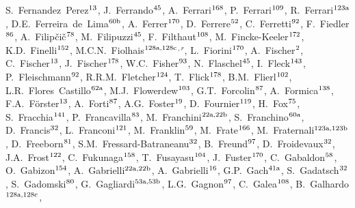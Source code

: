 \begin{flushleft}
S.~Fernandez~Perez$^\textrm{\scriptsize 13}$,
J.~Ferrando$^\textrm{\scriptsize 45}$,
A.~Ferrari$^\textrm{\scriptsize 168}$,
P.~Ferrari$^\textrm{\scriptsize 109}$,
R.~Ferrari$^\textrm{\scriptsize 123a}$,
D.E.~Ferreira~de~Lima$^\textrm{\scriptsize 60b}$,
A.~Ferrer$^\textrm{\scriptsize 170}$,
D.~Ferrere$^\textrm{\scriptsize 52}$,
C.~Ferretti$^\textrm{\scriptsize 92}$,
F.~Fiedler$^\textrm{\scriptsize 86}$,
A.~Filip\v{c}i\v{c}$^\textrm{\scriptsize 78}$,
M.~Filipuzzi$^\textrm{\scriptsize 45}$,
F.~Filthaut$^\textrm{\scriptsize 108}$,
M.~Fincke-Keeler$^\textrm{\scriptsize 172}$,
K.D.~Finelli$^\textrm{\scriptsize 152}$,
M.C.N.~Fiolhais$^\textrm{\scriptsize 128a,128c}$$^{,r}$,
L.~Fiorini$^\textrm{\scriptsize 170}$,
A.~Fischer$^\textrm{\scriptsize 2}$,
C.~Fischer$^\textrm{\scriptsize 13}$,
J.~Fischer$^\textrm{\scriptsize 178}$,
W.C.~Fisher$^\textrm{\scriptsize 93}$,
N.~Flaschel$^\textrm{\scriptsize 45}$,
I.~Fleck$^\textrm{\scriptsize 143}$,
P.~Fleischmann$^\textrm{\scriptsize 92}$,
R.R.M.~Fletcher$^\textrm{\scriptsize 124}$,
T.~Flick$^\textrm{\scriptsize 178}$,
B.M.~Flierl$^\textrm{\scriptsize 102}$,
L.R.~Flores~Castillo$^\textrm{\scriptsize 62a}$,
M.J.~Flowerdew$^\textrm{\scriptsize 103}$,
G.T.~Forcolin$^\textrm{\scriptsize 87}$,
A.~Formica$^\textrm{\scriptsize 138}$,
F.A.~F\"orster$^\textrm{\scriptsize 13}$,
A.~Forti$^\textrm{\scriptsize 87}$,
A.G.~Foster$^\textrm{\scriptsize 19}$,
D.~Fournier$^\textrm{\scriptsize 119}$,
H.~Fox$^\textrm{\scriptsize 75}$,
S.~Fracchia$^\textrm{\scriptsize 141}$,
P.~Francavilla$^\textrm{\scriptsize 83}$,
M.~Franchini$^\textrm{\scriptsize 22a,22b}$,
S.~Franchino$^\textrm{\scriptsize 60a}$,
D.~Francis$^\textrm{\scriptsize 32}$,
L.~Franconi$^\textrm{\scriptsize 121}$,
M.~Franklin$^\textrm{\scriptsize 59}$,
M.~Frate$^\textrm{\scriptsize 166}$,
M.~Fraternali$^\textrm{\scriptsize 123a,123b}$,
D.~Freeborn$^\textrm{\scriptsize 81}$,
S.M.~Fressard-Batraneanu$^\textrm{\scriptsize 32}$,
B.~Freund$^\textrm{\scriptsize 97}$,
D.~Froidevaux$^\textrm{\scriptsize 32}$,
J.A.~Frost$^\textrm{\scriptsize 122}$,
C.~Fukunaga$^\textrm{\scriptsize 158}$,
T.~Fusayasu$^\textrm{\scriptsize 104}$,
J.~Fuster$^\textrm{\scriptsize 170}$,
C.~Gabaldon$^\textrm{\scriptsize 58}$,
O.~Gabizon$^\textrm{\scriptsize 154}$,
A.~Gabrielli$^\textrm{\scriptsize 22a,22b}$,
A.~Gabrielli$^\textrm{\scriptsize 16}$,
G.P.~Gach$^\textrm{\scriptsize 41a}$,
S.~Gadatsch$^\textrm{\scriptsize 32}$,
S.~Gadomski$^\textrm{\scriptsize 80}$,
G.~Gagliardi$^\textrm{\scriptsize 53a,53b}$,
L.G.~Gagnon$^\textrm{\scriptsize 97}$,
C.~Galea$^\textrm{\scriptsize 108}$,
B.~Galhardo$^\textrm{\scriptsize 128a,128c}$,
$$
\end{flushleft}
